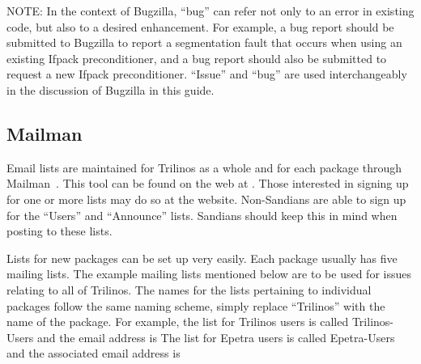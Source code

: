 \documentclass[12pt,relax]{TrilinosDevGuide}
\begin{document}
NOTE: In the context of Bugzilla, ``bug'' can refer not only to an error in 
existing code, but also to a desired enhancement.  For example, a bug report 
should be submitted to Bugzilla to report a segmentation fault that occurs 
when using an existing Ifpack preconditioner, and a bug report should also be
submitted to request a new Ifpack preconditioner.  ``Issue'' and ``bug'' are 
used interchangeably in the discussion of Bugzilla in this guide.

\subsection{Mailman}
\label{subsect:MailMan}
Email lists are maintained for Trilinos as a whole and for each package 
through Mailman~\cite{Mailman}.  This tool can be found on the web at 
\newline
{}.  
Those interested in signing 
up for one or more lists may do so at the website.  Non-Sandians are able to 
sign up for the ``Users'' and ``Announce'' lists.  Sandians should keep this 
in mind when posting to these lists.

Lists for new packages can be set up very easily.  Each package usually has 
five mailing lists.  The example mailing lists mentioned below are to be used 
for issues relating to all of Trilinos.  The names for the lists pertaining to 
individual packages follow the same naming scheme, simply replace ``Trilinos'' 
with the name of the package.  For example, the list for Trilinos users is 
called Trilinos-Users and the email address is 
  The list 
for Epetra users is called Epetra-Users and the associated email address is 

\end{document}
